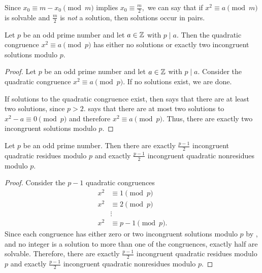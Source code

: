 \documentclass[letterpaper, 11 pt]{ximera}
\begin{document}
\begin{remark}
    Since $x_0\equiv m-x_0\pmod{m}$ implies $x_0\equiv \frac{m}{2},$ we can say that if $x^2\equiv a\pmod{m}$ is solvable and $\frac{m}{2}$ is \emph{not} a solution, then solutions occur in pairs.
\end{remark}

\begin{prop*}[Proposition 4.1]\label{prop:number-sqrts}
    Let $p$ be an odd prime number and let $a\in\mathbb Z$ with $p\mid a.$ Then the quadratic congruence $x^2\equiv a\pmod{p}$ has either no solutions or exactly two incongruent solutions modulo $p$.
\end{prop*}

\begin{proof}
	Let $p$ be an odd prime number and let $a\in\mathbb Z$ with $p\mid a.$ Consider the quadratic congruence $x^2\equiv a\pmod{p}.$ If no solutions exist, we are done.
	
	If solutions to the quadratic congruence exist, then  says that there are at least two solutions, since $p>2.$  says that there are at most two solutions to $x^2-a\equiv 0\pmod{p}$ and therefore $x^2\equiv a\pmod{p}.$ Thus, there are exactly two incongruent solutions modulo $p.$
\end{proof}

\begin{prop*}[Proposition 4.3]\label{prop:number-quad-residues}
	Let $p$ be an odd prime number. Then there are exactly $\frac{p-1}{2}$ incongruent quadratic residues modulo $p$ and exactly $\frac{p-1}{2}$ incongruent quadratic nonresidues modulo $p.$
\end{prop*}
\begin{proof}
	Consider the $p-1$ quadratic congruences
	\begin{align*}
 		x^2&\equiv 1\pmod{p}\\
		x^2&\equiv 2\pmod{p}\\
		&\vdots\\
		x^2&\equiv p-1\pmod{p}.
	\end{align*}
	Since each congruence has either zero or two incongruent solutions modulo $p$ by , and no integer is a solution to more than one of the congruences, exactly half are solvable. Therefore,  there are exactly $\frac{p-1}{2}$ incongruent quadratic residues modulo $p$ and exactly $\frac{p-1}{2}$ incongruent quadratic nonresidues modulo $p.$
\end{proof}
\end{document}
